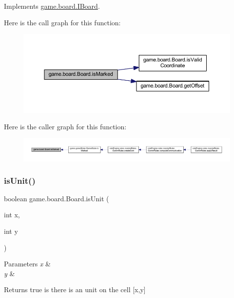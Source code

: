Implements \mbox{\hyperlink{interfacegame_1_1board_1_1_i_board_ae5dd67cb593fd6609401b115faa4c42e}{game.\+board.\+I\+Board}}.

Here is the call graph for this function\+:
\nopagebreak
\begin{figure}[H]
\begin{center}
\leavevmode
\includegraphics[width=350pt]{classgame_1_1board_1_1_board_af3a3c94fbe601ba799bfe105e0630be6_cgraph}
\end{center}
\end{figure}
Here is the caller graph for this function\+:
\nopagebreak
\begin{figure}[H]
\begin{center}
\leavevmode
\includegraphics[width=350pt]{classgame_1_1board_1_1_board_af3a3c94fbe601ba799bfe105e0630be6_icgraph}
\end{center}
\end{figure}
\mbox{\label{classgame_1_1board_1_1_board_aed65bda6e81b3ddbc14fa80bd52ac992}} 
\subsubsection{\texorpdfstring{is\+Unit()}{isUnit()}}
{\footnotesize\ttfamily boolean game.\+board.\+Board.\+is\+Unit (\begin{DoxyParamCaption}\item[{int}]{x,  }\item[{int}]{y }\end{DoxyParamCaption})\hspace{0.3cm}{\ttfamily [inline]}}


\begin{DoxyParams}{Parameters}
{\em x} & \\
\hline
{\em y} & \\
\hline
\end{DoxyParams}
\begin{DoxyReturn}{Returns}
true is there is an unit on the cell \mbox{[}x,y\mbox{]} 
\end{DoxyReturn}


